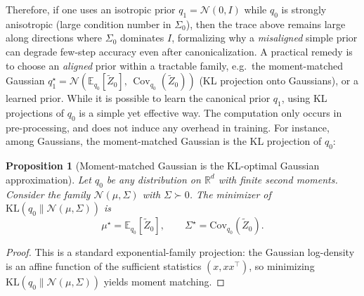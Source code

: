 \documentclass{article}
\theoremstyle{plain}
\newtheorem{proposition}[theorem]{Proposition}
\theoremstyle{definition}
\theoremstyle{remark}
\newcommand{\1}{\mathbf{1}}
\begin{document}
Therefore, if one uses an isotropic prior $q_1=\mathcal N(0,I)$ while $q_0$ is strongly anisotropic (large condition number in $\Sigma_0$),
then the trace above remains large along directions where $\Sigma_0$ dominates $I$, formalizing why a \emph{misaligned} simple prior can
degrade few-step accuracy even after canonicalization. A practical remedy is to choose an \emph{aligned} prior within a tractable family,
e.g.\ the moment-matched Gaussian $q_1^\star=\mathcal N(\mathbb{E}_{q_0}[\widetilde Z_0],\,\operatorname{Cov}_{q_0}(\widetilde Z_0))$
(KL projection onto Gaussians), or a learned prior.
While it is possible to learn the canonical prior $q_1$, using KL projections of $q_0$ is a simple yet effective way. The computation only occurs in pre-processing, and does not induce any overhead in training.
For instance, among Gaussians, the moment-matched Gaussian is the KL projection of $q_0$:
\begin{proposition}[Moment-matched Gaussian is the KL-optimal Gaussian approximation]
\label{prop:kl-gaussian-projection}
Let $q_0$ be any distribution on $\mathbb{R}^d$ with finite second moments. Consider the family
$\mathcal{N}(\mu,\Sigma)$ with $\Sigma\succ 0$. The minimizer of $\mathrm{KL}(q_0\|\mathcal{N}(\mu,\Sigma))$ is
\begin{equation}
\mu^\star = \mathbb{E}_{q_0}[\widetilde Z_0],\qquad
\Sigma^\star = \mathrm{Cov}_{q_0}(\widetilde Z_0).
\end{equation}
\end{proposition}
\begin{proof}
This is a standard exponential-family projection: the Gaussian log-density is an affine function of the sufficient
statistics $(x,xx^\top)$, so minimizing $\mathrm{KL}(q_0\|\mathcal{N}(\mu,\Sigma))$ yields moment matching.
\end{proof}
\end{document}
